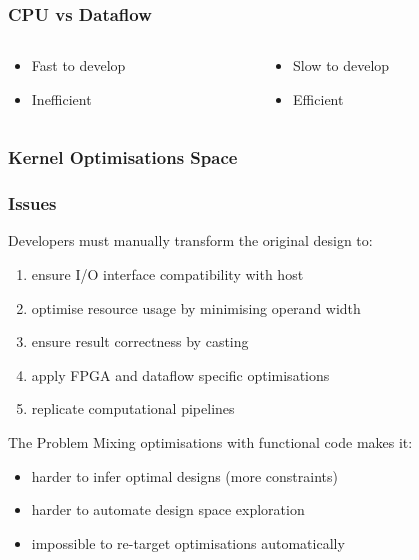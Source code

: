 \begin{frame}
  \frametitle{CPU vs Dataflow}
  \begin{columns}
    \begin{column}{.5\linewidth}
      \begin{figure}[!ht]
        \centering
        \def\svgwidth{\linewidth}
        
      \end{figure}
      \begin{itemize}
      \item Fast to develop
      \item Inefficient
      \end{itemize}
    \end{column}
    \begin{column}{.5\linewidth}
      \begin{figure}[!ht]
        \centering
        \def\svgwidth{\linewidth}
        
      \end{figure}
      \begin{itemize}
      \item Slow to develop
      \item Efficient
      \end{itemize}
    \end{column}
  \end{columns}
\end{frame}

\begin{frame}[fragile]
  \frametitle{Kernel Optimisations Space}
  \begin{figure}[!ht]
    \centering
    \def\svgwidth{\linewidth}
    
  \end{figure}
\end{frame}

\begin{frame}[fragile]
  \frametitle{Issues}
  Developers must manually transform the original design to:
  \begin{enumerate}
  \item ensure I/O interface compatibility with host
  \item optimise resource usage by minimising operand width
  \item ensure result correctness by casting
  \item apply FPGA and dataflow specific optimisations
  \item replicate computational pipelines
  \end{enumerate}
\vspace{0.5cm}
  \begin{beamerboxesrounded}{The Problem}
    Mixing optimisations with functional code makes it:
    \begin{itemize}
    \item harder to infer optimal designs (more constraints)
    \item harder to automate design space exploration
    \item impossible to re-target optimisations automatically
    \end{itemize}
  \end{beamerboxesrounded}
\end{frame}
